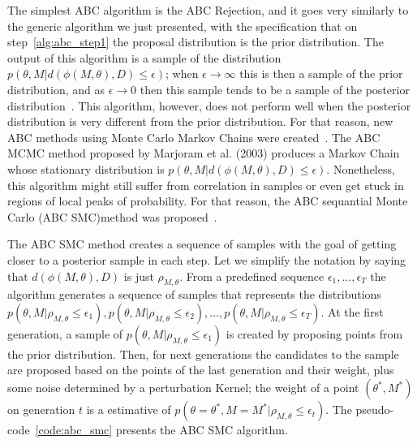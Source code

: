 The simplest ABC algorithm is the ABC Rejection, and it goes very 
similarly to the generic algorithm we just presented, with the 
specification that on step~\ref{alg:abc_step1} the proposal distribution
is the prior distribution. The output of this algorithm is a sample of 
the distribution $p (\theta, M| d (\phi (M, \theta), D) \leq \epsilon)$; 
when $\epsilon \to \infty$ this is then a sample of the prior 
distribution, and as $\epsilon \to 0$ then this sample tends to be a
sample of the posterior distribution~\cite{Pritchard1999}. This 
algorithm, however, does not perform well when the posterior 
distribution is very different from the prior distribution. For that 
reason, new ABC methods using Monte Carlo Markov Chains were 
created~\cite{Marjoram2003}. The ABC MCMC method proposed by Marjoram et 
al. (2003) produces a Markov Chain whose stationary distribution is
$p (\theta, M | d (\phi (M, \theta), D) \leq \epsilon)$. Nonetheless, 
this algorithm might still suffer from correlation in samples or even
get stuck in regions of local peaks of probability. For that reason,
the ABC sequantial Monte Carlo (ABC SMC)method was 
proposed~\cite{Toni2009}.

The ABC SMC method creates a sequence of samples with the goal of 
getting closer to a posterior sample in each step. Let we simplify the
notation by saying that $d(\phi (M, \theta), D)$ is just 
$\rho_{M, \theta}$. From a predefined sequence $\epsilon_1, \ldots, 
\epsilon_T$ the algorithm generates a sequence of samples that 
represents the distributions 
$p (\theta, M| \rho_{M, \theta} \leq \epsilon_1), 
p (\theta, M| \rho_{M, \theta} \leq \epsilon_2), \ldots,
p (\theta, M| \rho_{M, \theta} \leq \epsilon_T)$. At the first 
generation, a sample of 
$p (\theta, M| \rho_{M, \theta} \leq \epsilon_1)$ is created by 
proposing points from the prior distribution. Then, for next generations
the candidates to the sample are proposed based on the points of the 
last generation and their weight, plus some noise determined by a 
perturbation Kernel; the weight of a point $(\theta^*, M^*)$ on 
generation $t$ is a estimative of  
$p (\theta = \theta^*, M = M^* | \rho_{M, \theta} \leq \epsilon_t)$. The 
pseudo-code~\ref{code:abc_smc} presents the ABC SMC algorithm.

